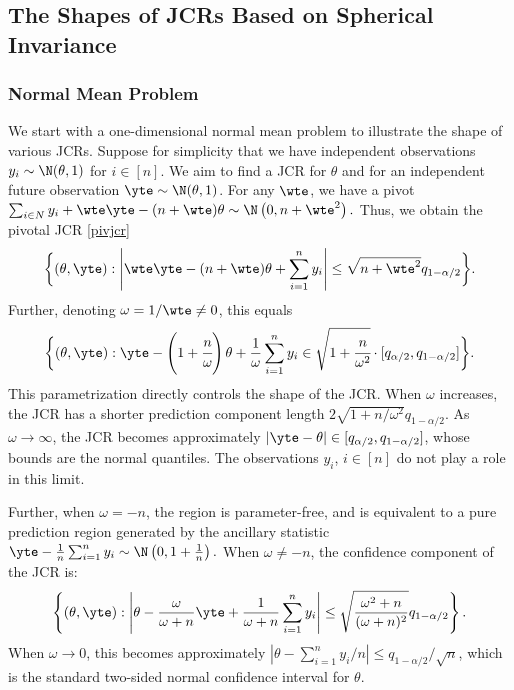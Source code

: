 \documentclass[english]{article}
\begin{document}
\subsection{The Shapes of JCRs Based on Spherical Invariance}\label{sec:shape-example}

\subsubsection{Normal Mean Problem}\label{sec:toy-model}

We start with a one-dimensional normal mean problem
to illustrate the shape of various JCRs.
Suppose for simplicity that 
we have independent observations $y_i \sim \N(\theta,1)$ 
for $i\in [n]$. 
We aim to find a JCR for $\theta$ and 
for an independent future observation 
$\yte \sim \N(\theta,1)$.
For any $\wte$,
 we have a pivot
$\sum_{i \in N} y_i + \wte \yte - (n+\wte)\theta \sim \N\left(0,n+ \wte^2\right).
$
Thus, we obtain the pivotal JCR \eqref{pivjcr} %
\begin{align*}%
    \bigg\{(\theta,\yte): 
    \left|\wte\yte - (n+\wte)\theta +  \sum_{i=1}^n y_i\right| \leq \sqrt{n + \wte^2}q_{1-\alpha/2}
    \bigg\}.
\end{align*}
Further, 
denoting $\omega = 1/\wte \neq 0$, this equals
\begin{align}\label{eq:toymodel-JCR1}
    \bigg\{(\theta,\yte): 
    \yte -  \left(1+\cfrac{n}{\omega}\right)\theta  + \frac{1}{\omega}\sum_{i=1}^n y_i \in 
    \sqrt{1 + \cfrac{n}{\omega^2}} \cdot [q_{\alpha/2}, q_{1-\alpha/2}]
    \bigg\}.
\end{align}
This parametrization directly controls the shape of the JCR.
When $\omega$ increases, 
the JCR has a shorter prediction component length $2\sqrt{1 + n/\omega^2}q_{1-\alpha/2}$. 
As $\omega \rightarrow \infty$, the JCR
becomes approximately 
$|\yte - \theta| \in [q_{\alpha/2},q_{1-\alpha/2}]$,
whose bounds are the normal quantiles. 
The observations $y_i$, $i \in [n]$ do not play a role in this limit.

Further, when 
$\omega = -n$, the region is parameter-free, and 
is equivalent to a pure prediction region generated by the ancillary statistic
$\yte - \frac{1}{n}\sum_{i=1}^n y_i \sim \N\left(0,1+\frac{1}{n}\right).$
When $\omega \neq -n$, 
the confidence component of the JCR is:
\begin{align}\label{eq:toymodel-JCR2}
    \left\{(\theta,\yte): 
    \left|\theta - \frac{\omega}{\omega + n}\yte + \frac{1}{\omega + n}\sum_{i=1}^n y_i\right| \leq \sqrt{\frac{\omega^2 + n}{(\omega + n)^2}} q_{1-\alpha/2}
    \right\}.
\end{align}
When $\omega \rightarrow 0$, this becomes approximately $|\theta - \sum_{i=1}^n y_i / n| \leq q_{1-\alpha/2}/\sqrt{n}$, which is the standard two-sided normal confidence interval for $\theta$. 
\end{document}

